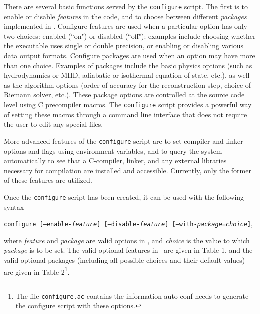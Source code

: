 There are several basic functions served by the {\tt configure} script.
The first is to enable or disable {\it features} in the code, and to
choose between different {\it packages} implemented in \ath.  Configure
features are used when a particular option has only two choices:
enabled (``on") or disabled (``off"): examples include choosing whether
the executable uses single or double precision, or enabling or disabling
various data output formats.  Configure packages are used when an
option may have more than one choice.  Examples of packages include
the basic physics options (such as hydrodynamics or MHD, adiabatic or
isothermal equation of state, etc.), as well as the algorithm options
(order of accuracy for the reconstruction step, choice of Riemann solver,
etc.).  These package options are controlled at the source code
level using C precompiler macros.  The {\tt configure} script provides
a powerful way of setting these macros through a command line interface
that does not require the user to edit any special files.

More advanced features of the {\tt configure} script are to set compiler
and linker options and flags using environment variables, and to query the
system automatically to see that a C-compiler, linker, and any external
libraries necessary for compilation are installed and accessible.
Currently, only the former of these features are utilized.

Once the {\tt configure} script has been created, it can be used
with the following
syntax
\begin{center}
{\tt configure [--enable-{\it feature}] [--disable-{\it feature}]
[--with-{\it package}={\it choice}]},
\end{center}
where {\it feature} and {\it package}
are valid options in \ath, and {\it choice} is the value to which
{\it package} is to be set.  The valid optional features in \ath\ are given in
Table 1, and the valid optional packages (including all possible choices and
their default values) are given in Table 2\footnote{The file {\tt configure.ac}
contains the information auto-conf needs to generate the configure script
with these options.}.

